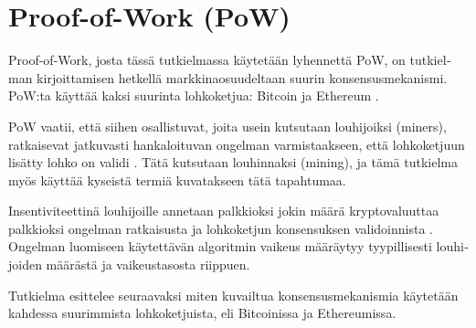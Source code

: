 \section{Proof-of-Work (PoW)\label{methods}}
\begin{otherlanguage}{english}
Proof-of-Work, josta tässä tutkielmassa käytetään lyhennettä PoW, on tutkielman kirjoittamisen hetkellä markkinaosuudeltaan suurin konsensusmekanismi. PoW:ta käyttää kaksi suurinta lohkoketjua: Bitcoin ja Ethereum \cite{Coingecko}.

PoW vaatii, että siihen osallistuvat, joita usein kutsutaan louhijoiksi (miners), ratkaisevat jatkuvasti hankaloituvan ongelman varmistaakseen, että lohkoketjuun lisätty lohko on validi \cite{blockchain1}. Tätä kutsutaan louhinnaksi (mining), ja tämä tutkielma myös käyttää kyseistä termiä kuvatakseen tätä tapahtumaa.

Insentiviteettinä louhijoille annetaan palkkioksi jokin määrä kryptovaluuttaa palkkioksi ongelman ratkaisusta ja lohkoketjun konsensuksen validoinnista \cite{blockchain1}. Ongelman luomiseen käytettävän algoritmin vaikeus määräytyy tyypillisesti louhijoiden määrästä ja vaikeustasosta riippuen.

Tutkielma esittelee seuraavaksi miten kuvailtua konsensusmekanismia käytetään kahdessa suurimmista lohkoketjuista, eli Bitcoinissa ja Ethereumissa.




\end{otherlanguage}